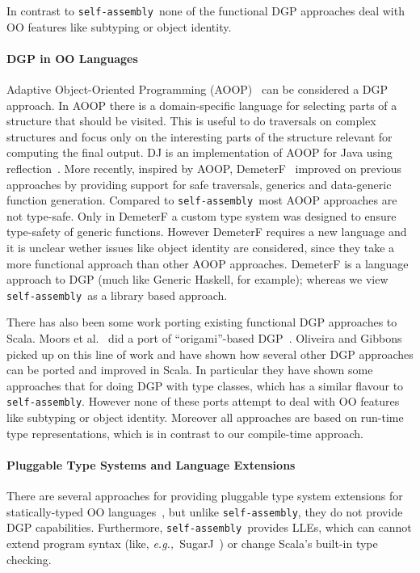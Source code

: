 \documentclass[preprint,nocopyrightspace]{sigplanconf}
\newcommand{\eg}{{\em e.g.,~}}
\newcommand{\selfassembly}{\texttt{self-assembly~}}
\newcommand{\sselfassembly}{\texttt{self-assembly}}
\begin{document}
In contrast to \selfassembly none of the functional DGP approaches
deal with OO features like subtyping or object identity.

\paragraph{DGP in OO Languages} Adaptive Object-Oriented Programming
(AOOP)~\cite{DemeterBook} can be considered a DGP approach. In AOOP
there is a domain-specific language for selecting parts of a structure
that should be visited. This is useful to do traversals on complex
structures and focus only on the interesting parts of the structure
relevant for computing the final output.  DJ is an implementation of
AOOP for Java using reflection~\cite{DJ}. More recently, inspired by
AOOP, DemeterF~\cite{OOGP} improved on previous approaches by providing support for
safe traversals, generics and data-generic function generation.
Compared to \selfassembly most AOOP approaches are not type-safe. Only in
DemeterF a custom type system was designed to ensure type-safety of
generic functions. However DemeterF requires a new language and it
is unclear wether issues like object identity are considered, since
they take a more functional approach than other AOOP approaches.
DemeterF is a language approach to DGP (much like Generic Haskell, for
example); whereas we view \selfassembly as a library based approach.

There has also been some work porting existing functional DGP
approaches to Scala.  Moors et al.~\cite{OODGPMoors} did a port of
``origami''-based DGP~\cite{DGPGibbons}. Oliveira and
Gibbons~\cite{ScalaGenericProgrammers} picked up on this line of work
and have shown how several other DGP approaches can be ported and
improved in Scala. In particular they have shown some approaches that
for doing DGP with type classes, which has a similar flavour to
\sselfassembly.  However none of these ports attempt to deal with OO
features like subtyping or object identity. Moreover all approaches
are based on run-time type representations, which is in contrast to
our compile-time approach.

\paragraph{Pluggable Type Systems and Language Extensions}
There are several approaches for providing pluggable type system extensions
for statically-typed OO languages~\cite{DietlChecker, PapiChecker,
SemanticTypeQualifiers}, but unlike \sselfassembly, they do not provide DGP
capabilities. Furthermore, \selfassembly provides LLEs, which can cannot
extend program syntax (like, \eg SugarJ~\cite{SugarJ}) or change Scala's
built-in type checking.
\end{document}
